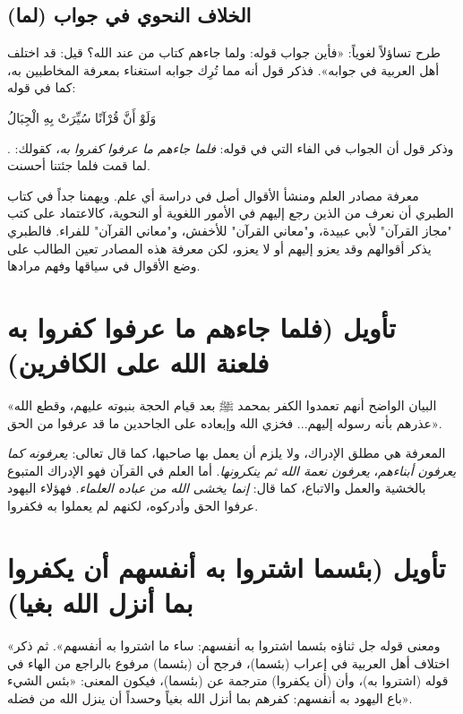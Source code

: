 \subsection{الخلاف النحوي في جواب (لما)}
طرح  تساؤلاً لغوياً: «فأين جواب قوله: ولما جاءهم كتاب من عند الله؟ قيل: قد اختلف أهل العربية في جوابه».
فذكر قول  أنه مما تُرِك جوابه استغناء بمعرفة المخاطبين به، كما في قوله: \begin{ayah}وَلَوْ أَنَّ قُرْآنًا سُيِّرَتْ بِهِ الْجِبَالُ\end{ayah}. وذكر قول  أن الجواب في الفاء التي في قوله: \textit{فلما جاءهم ما عرفوا كفروا به}، كقولك: لما قمت فلما جئتنا أحسنت.

\begin{fawaid}
معرفة مصادر العلم ومنشأ الأقوال أصل في دراسة أي علم. ويهمنا جداً في كتاب الطبري أن نعرف من الذين رجع إليهم في الأمور اللغوية أو النحوية، كالاعتماد على كتب "مجاز القرآن" لأبي عبيدة، و"معاني القرآن" للأخفش، و"معاني القرآن" للفراء. فالطبري يذكر أقوالهم وقد يعزو إليهم أو لا يعزو، لكن معرفة هذه المصادر تعين الطالب على وضع الأقوال في سياقها وفهم مرادها.
\end{fawaid}

\separator

\section{تأويل (فلما جاءهم ما عرفوا كفروا به فلعنة الله على الكافرين)}
 «البيان الواضح أنهم تعمدوا الكفر بمحمد ﷺ بعد قيام الحجة بنبوته عليهم، وقطع الله عذرهم بأنه رسوله إليهم... فخزي الله وإبعاده على الجاحدين ما قد عرفوا من الحق».

\begin{fawaid}
المعرفة هي مطلق الإدراك، ولا يلزم أن يعمل بها صاحبها، كما قال تعالى: \textit{يعرفونه كما يعرفون أبناءهم}، \textit{يعرفون نعمة الله ثم ينكرونها}. أما العلم في القرآن فهو الإدراك المتبوع بالخشية والعمل والاتباع، كما قال: \textit{إنما يخشى الله من عباده العلماء}. فهؤلاء اليهود عرفوا الحق وأدركوه، لكنهم لم يعملوا به فكفروا.
\end{fawaid}

\separator

\section{تأويل (بئسما اشتروا به أنفسهم أن يكفروا بما أنزل الله بغيا)}
 «ومعنى قوله جل ثناؤه بئسما اشتروا به أنفسهم: ساء ما اشتروا به أنفسهم».
ثم ذكر اختلاف أهل العربية في إعراب (بئسما)، فرجح أن (بئسما) مرفوع بالراجع من الهاء في قوله (اشتروا به)، وأن (أن يكفروا) مترجمة عن (بئسما)، فيكون المعنى: «بئس الشيء باع اليهود به أنفسهم: كفرهم بما أنزل الله بغياً وحسداً أن ينزل الله من فضله».

